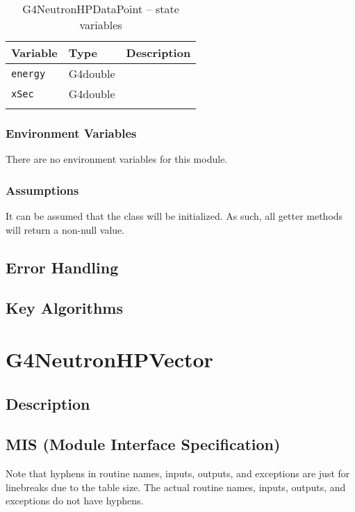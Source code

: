 \documentclass[12pt]{article}
\begin{document}
\begin{table}[h]
\caption{G4NeutronHPDataPoint -- state variables}\label{Table_NeutronHPDataPointStateVariables}
\begin{tabularx}{\textwidth}{llX}
\toprule
\bf Variable & \bf Type & \bf Description\\\midrule
\arrayrulecolor{lightgray}
\texttt{energy} & G4double & \\\hline
\texttt{xSec}   & G4double & \\
\arrayrulecolor{black}
\bottomrule
\end{tabularx}
\end{table}

\subsubsection{Environment Variables}%
There are no environment variables for this module.

\subsubsection{Assumptions}%
It can be assumed that the class will be initialized. As such, all getter methods will return a non-null value.

\subsection{Error Handling}

\subsection{Key Algorithms}


\section{G4NeutronHPVector}

\subsection{Description}

\subsection{MIS (Module Interface Specification)}
Note that hyphens in routine names, inputs, outputs, and exceptions are just for linebreaks due to the table size. The actual routine names, inputs, outputs, and exceptions do not have hyphens.
\end{document}
